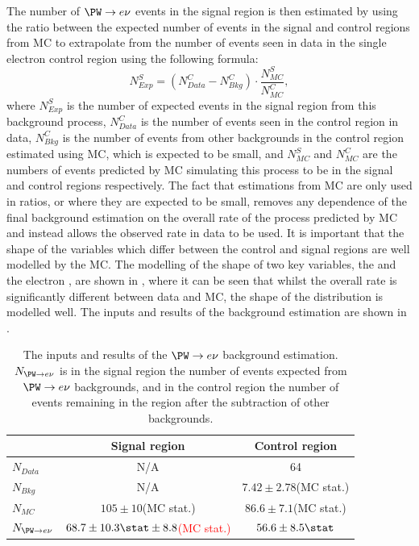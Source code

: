 The number of $\PW\rightarrow e\nu$ events in the signal region is then estimated by using the ratio between the expected number of events in the signal and control regions from \ac{MC} to extrapolate from the number of events seen in data in the single electron control region using the following formula:
\begin{equation}
  \label{eq:wdatabkg}
  N^{S}_{Exp}=\left(N^{C}_{Data}-N^{C}_{Bkg}\right)\cdot\frac{N^{S}_{MC}}{N^{C}_{MC}},
\end{equation}
where $N^{S}_{Exp}$ is the number of expected events in the signal region from this background process, $N^{C}_{Data}$ is the number of events seen in the control region in data, $N^{C}_{Bkg}$ is the number of events from other backgrounds in the control region estimated using \ac{MC}, which is expected to be small, and $N^{S}_{MC}$ and $N^{C}_{MC}$ are the numbers of events predicted by \ac{MC} simulating this process to be in the signal and control regions respectively. The fact that estimations from \ac{MC} are only used in ratios, or where they are expected to be small, removes any dependence of the final background estimation on the overall rate of the process predicted by \ac{MC} and instead allows the observed rate in data to be used. It is important that the shape of the variables which differ between the control and signal regions are well modelled by the \ac{MC}. The modelling of the shape of two key variables, the \MET and the electron \pt, are shown in , where it can be seen that whilst the overall rate is significantly different between data and \ac{MC}, the shape of the distribution is modelled well.  The inputs and results of the background estimation are shown in .

\begin{table}
  \caption{The inputs and results of the $\PW\rightarrow e\nu$ background estimation. $N_{\PW\rightarrow e\nu}$ is in the signal region the number of events expected from $\PW\rightarrow e\nu$ backgrounds, and in the control region the number of events remaining in the region after the subtraction of other backgrounds.}
  \label{tab:promptwenu}
  \begin{tabular}{lcc}
    \hline
    \hline
    & Signal region & Control region \\
    \hline
    \hline
    $N_{Data}$ & N/A & 64\\
    $N_{Bkg}$ & N/A & $7.42\pm2.78$(\ac{MC} stat.) \\
    $N_{MC}$& $105\pm10$(\ac{MC} stat.) & $86.6\pm 7.1$(\ac{MC} stat.) \\
    \hline
    $N_{\PW\rightarrow e\nu}$& \textcolor{red}{$68.7\pm 10.3\stat\pm 8.8$(MC stat.)} & $56.6\pm 8.5\stat$ \\
    \hline
    \hline
  \end{tabular}
\end{table}

